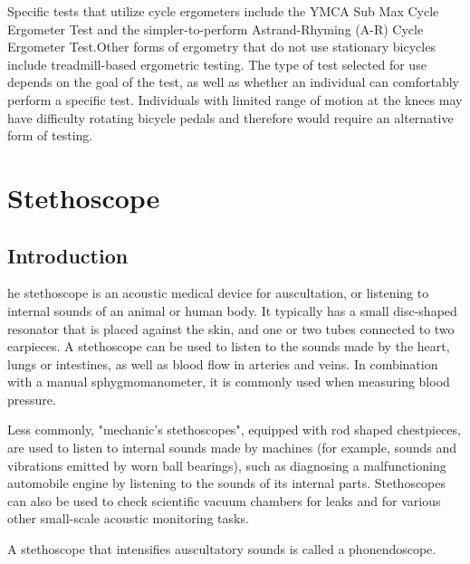 \documentclass[12pt]{article}
\begin{document}
Specific tests that utilize cycle ergometers include the YMCA Sub Max Cycle Ergometer Test and the simpler-to-perform Astrand-Rhyming (A-R) Cycle Ergometer Test.Other forms of ergometry that do not use stationary bicycles include treadmill-based ergometric testing. The type of test selected for use depends on the goal of the test, as well as whether an individual can comfortably perform a specific test. Individuals with limited range of motion at the knees may have difficulty rotating bicycle pedals and therefore would require an alternative form of testing.
\section{Stethoscope}
\subsection{Introduction}
he stethoscope is an acoustic medical device for auscultation, or listening to internal sounds of an animal or human body. It typically has a small disc-shaped resonator that is placed against the skin, and one or two tubes connected to two earpieces. A stethoscope can be used to listen to the sounds made by the heart, lungs or intestines, as well as blood flow in arteries and veins. In combination with a manual sphygmomanometer, it is commonly used when measuring blood pressure.

Less commonly, "mechanic's stethoscopes", equipped with rod shaped chestpieces, are used to listen to internal sounds made by machines (for example, sounds and vibrations emitted by worn ball bearings), such as diagnosing a malfunctioning automobile engine by listening to the sounds of its internal parts. Stethoscopes can also be used to check scientific vacuum chambers for leaks and for various other small-scale acoustic monitoring tasks.

A stethoscope that intensifies auscultatory sounds is called a phonendoscope.
\end{document}
